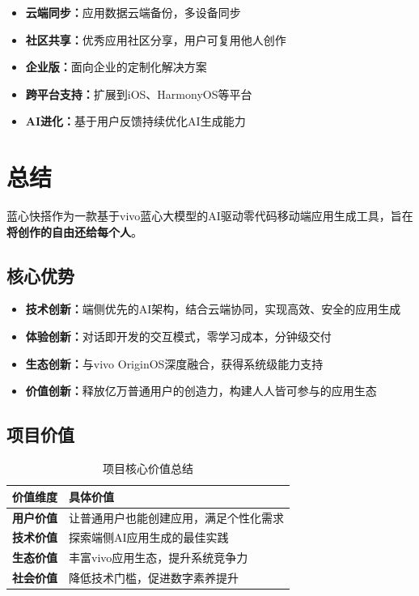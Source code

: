 \documentclass[a4paper,12pt]{ctexart}
\newcommand{\highlight}[1]{\textcolor{vivoblue}{\textbf{#1}}}
\begin{document}
\begin{itemize}[leftmargin=2em]
    \item \textbf{云端同步：}应用数据云端备份，多设备同步
    \item \textbf{社区共享：}优秀应用社区分享，用户可复用他人创作
    \item \textbf{企业版：}面向企业的定制化解决方案
    \item \textbf{跨平台支持：}扩展到iOS、HarmonyOS等平台
    \item \textbf{AI进化：}基于用户反馈持续优化AI生成能力
\end{itemize}

\section{总结}

蓝心快搭作为一款基于vivo蓝心大模型的AI驱动零代码移动端应用生成工具，旨在\highlight{将创作的自由还给每个人}。

\subsection{核心优势}

\begin{itemize}[leftmargin=2em]
    \item \highlight{技术创新：}端侧优先的AI架构，结合云端协同，实现高效、安全的应用生成
    \item \highlight{体验创新：}对话即开发的交互模式，零学习成本，分钟级交付
    \item \highlight{生态创新：}与vivo OriginOS深度融合，获得系统级能力支持
    \item \highlight{价值创新：}释放亿万普通用户的创造力，构建人人皆可参与的应用生态
\end{itemize}

\subsection{项目价值}

\begin{table}[H]
    \centering
    \caption{项目核心价值总结}
    \begin{tabularx}{\textwidth}{|l|X|}
        \hline
        \textbf{价值维度} & \textbf{具体价值} \\
        \hline
        \highlight{用户价值} & 让普通用户也能创建应用，满足个性化需求 \\
        \hline
        \highlight{技术价值} & 探索端侧AI应用生成的最佳实践 \\
        \hline
        \highlight{生态价值} & 丰富vivo应用生态，提升系统竞争力 \\
        \hline
        \highlight{社会价值} & 降低技术门槛，促进数字素养提升 \\
        \hline
    \end{tabularx}
\end{table}
\end{document}
